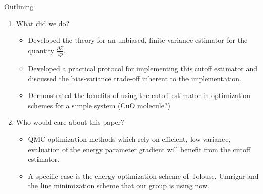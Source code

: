 \documentclass{article}
\begin{document}
Outlining 

\begin{enumerate}
\item What did we do? 
\begin{itemize}
\item Developed the theory for an unbiased, finite variance estimator for the quantity $\frac{\partial E}{\partial p}$.
\item Developed a practical protocol for implementing this cutoff estimator and discussed the bias-variance trade-off inherent to the implementation.
\item Demonstrated the benefits of using the cutoff estimator in optimization schemes for a simple system (CuO molecule?)
\end{itemize} 
\item Who would care about this paper?

\begin{itemize}
\item QMC optimization methods which rely on efficient, low-variance, evaluation of the energy parameter gradient will benefit from the cutoff estimator. 
\item A specific case is the energy optimization scheme of Tolouse, Umrigar and the line minimization scheme that our group is using now.
\end{itemize} 


\end{enumerate}
\end{document}
